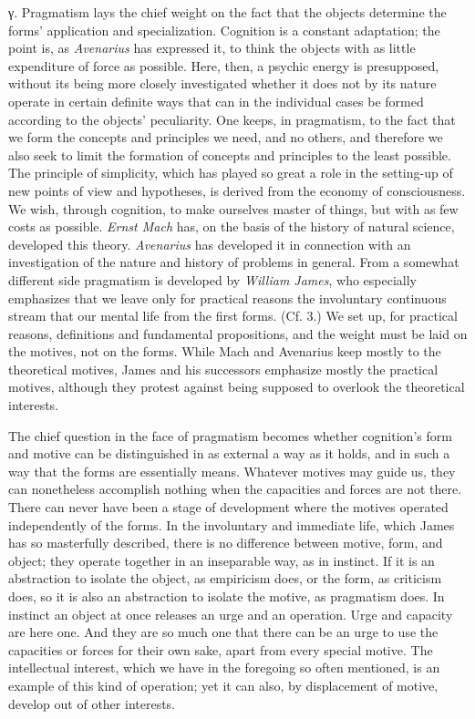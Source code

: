 \documentclass[12pt,a4paper]{book}
\newcommand{\opage}[1]{\marginnote{\footnotesize\textit{[#1]}}}
\begin{document}
\opage{270}γ. Pragmatism lays the chief weight on the fact that the objects determine the
forms' application and specialization. Cognition is a constant adaptation; the
point is, as \emph{Avenarius} has expressed it, to think the objects with as
little expenditure of force as possible. Here, then, a psychic energy is
presupposed, without its being more closely investigated whether it does not by
its nature operate in certain definite ways that can in the individual cases be
formed according to the objects' peculiarity. One keeps, in pragmatism, to the
fact that we form the concepts and principles we need, and no others, and
therefore we also seek to limit the formation of concepts and principles to the
least possible. The principle of simplicity, which has played so great a role in
the setting-up of new points of view and hypotheses, is derived from the economy
of consciousness. We wish, through cognition, to make ourselves master of
things, but with as few costs as possible. \emph{Ernst Mach} has, on the basis
of the history of natural science, developed this theory. \emph{Avenarius} has
developed it in connection with an investigation of the nature and history of
problems in general. From a somewhat different side pragmatism is developed by
\emph{William James}, who especially emphasizes that we leave only for practical
reasons the involuntary continuous stream that our mental life from the first
forms. (Cf. 3.) We set up, for practical reasons, definitions and fundamental
propositions, and the weight must be laid on the motives, not on the forms.
While Mach and Avenarius keep mostly to the theoretical motives, James and his
successors emphasize mostly the practical motives, although they protest against
being supposed to overlook the theoretical interests.

The chief question in the face of pragmatism becomes whether cognition's form
and motive can be distinguished in as external a way as it holds, and in such a
way that the forms are essentially means. Whatever motives may guide us, they
can nonetheless accomplish nothing when the capacities and forces are not there.
There can never have been a stage of development where the motives operated
independently of the forms. In the involuntary and immediate life, which James
has so masterfully described, \opage{271}there is no difference between motive, form, and
object; they operate together in an inseparable way, as in instinct. If it is an
abstraction to isolate the object, as empiricism does, or the form, as criticism
does, so it is also an abstraction to isolate the motive, as pragmatism does. In
instinct an object at once releases an urge and an operation. Urge and capacity
are here one. And they are so much one that there can be an urge to use the
capacities or forces for their own sake, apart from every special motive. The
intellectual interest, which we have in the foregoing so often mentioned, is an
example of this kind of operation; yet it can also, by displacement of motive,
develop out of other interests.
\end{document}
